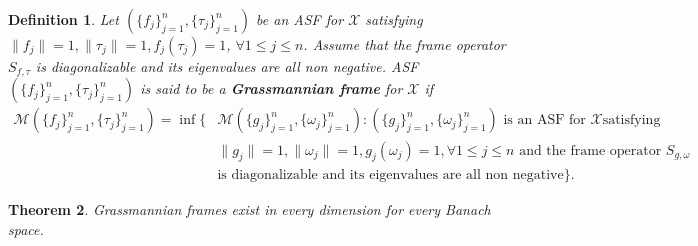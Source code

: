 \documentclass{amsart}
\newtheorem{theorem}{Theorem}[section]
\newtheorem{definition}[theorem]{Definition}
\begin{document}
  \begin{definition}\label{GRASSMANNIANDEFINITION}
 	Let  $ (\{f_j \}_{j=1}^n, \{\tau_j \}_{j=1}^n) $ be an ASF  for $\mathcal{X}$ satisfying $\|f_j\|= 1, \|\tau_j\|=1, f_j(\tau_j)=1$, $\forall 1\leq j \leq n$. 	Assume that  the  frame operator 
 $	S_{f, \tau}$  is diagonalizable and its eigenvalues are all non negative.  ASF $ (\{f_j \}_{j=1}^n, \{\tau_j \}_{j=1}^n) $   is said to be a \textbf{Grassmannian frame} for  $\mathcal{X}$ if 
  	\begin{align*}
  		\mathcal{M}(\{f_j \}_{j=1}^n, \{\tau_j \}_{j=1}^n)=\inf\bigg\{&\mathcal{M}(\{g_j \}_{j=1}^n, \{\omega_j \}_{j=1}^n): (\{g_j \}_{j=1}^n, \{\omega_j \}_{j=1}^n) \text{ is an ASF for }\mathcal{X}  
  		  \text{satisfying } \\
  		  &\|g_j\|=1, \|\omega_j\|= 1, g_j(\omega_j)=1, \forall 1\leq j \leq n \text{ and the frame operator }  S_{g,\omega}\\
  		& \text{is diagonalizable and its eigenvalues are all non negative}\bigg\}.	
  	\end{align*}		
  \end{definition}
\begin{theorem}
Grassmannian frames exist in every dimension for every Banach space.
\end{theorem}
\end{document}
